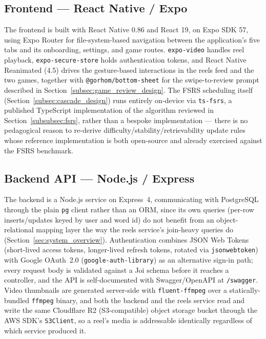     \subsection{Frontend --- React Native / Expo}
    \label{subsec:frontend_stack}
    The frontend is built with React Native 0.86 and React 19, on Expo SDK 57, using Expo Router for file-system-based navigation between the application's five tabs and its onboarding, settings, and game routes. \texttt{expo-video} handles reel playback, \texttt{expo-secure-store} holds authentication tokens, and React Native Reanimated (4.5) drives the gesture-based interactions in the reels feed and the two games, together with \texttt{@gorhom/bottom-sheet} for the swipe-to-review prompt described in Section~\ref{subsec:game_review_design}. The FSRS scheduling itself (Section~\ref{subsec:cascade_design}) runs entirely on-device via \texttt{ts-fsrs}, a published TypeScript implementation of the algorithm reviewed in Section~\ref{subsubsec:fsrs}, rather than a bespoke implementation --- there is no pedagogical reason to re-derive difficulty/stability/retrievability update rules whose reference implementation is both open-source and already exercised against the FSRS benchmark.

    \subsection{Backend API --- Node.js / Express}
    \label{subsec:backend_stack}
    The backend is a Node.js service on Express~4, communicating with PostgreSQL through the plain \texttt{pg} client rather than an ORM, since its own queries (per-row inserts/updates keyed by user and word id) do not benefit from an object-relational mapping layer the way the reels service's join-heavy queries do (Section~\ref{sec:system_overview}). Authentication combines JSON Web Tokens (short-lived access tokens, longer-lived refresh tokens, rotated via \texttt{jsonwebtoken}) with Google OAuth~2.0 (\texttt{google-auth-library}) as an alternative sign-in path; every request body is validated against a Joi schema before it reaches a controller, and the API is self-documented with Swagger/OpenAPI at \texttt{/swagger}. Video thumbnails are generated server-side with \texttt{fluent-ffmpeg} over a statically-bundled \texttt{ffmpeg} binary, and both the backend and the reels service read and write the same Cloudflare R2 (S3-compatible) object storage bucket through the AWS SDK's \texttt{S3Client}, so a reel's media is addressable identically regardless of which service produced it.

